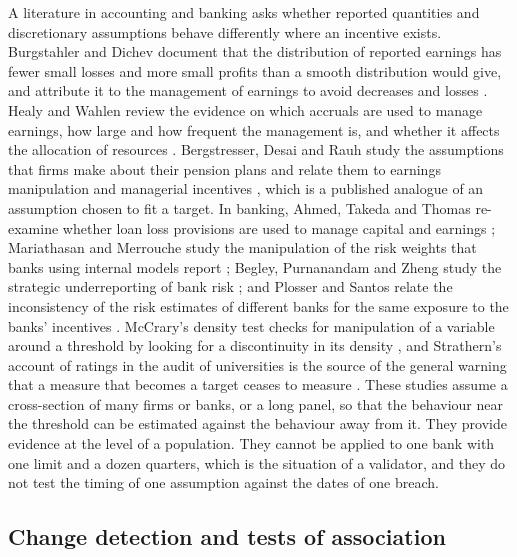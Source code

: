 A literature in accounting and banking asks whether reported quantities and discretionary assumptions behave differently where an incentive exists. Burgstahler and Dichev document that the distribution of reported earnings has fewer small losses and more small profits than a smooth distribution would give, and attribute it to the management of earnings to avoid decreases and losses \citep{burgstahler1997}. Healy and Wahlen review the evidence on which accruals are used to manage earnings, how large and how frequent the management is, and whether it affects the allocation of resources \citep{healy1999}. Bergstresser, Desai and Rauh study the assumptions that firms make about their pension plans and relate them to earnings manipulation and managerial incentives \citep{bergstresser2006}, which is a published analogue of an assumption chosen to fit a target. In banking, Ahmed, Takeda and Thomas re-examine whether loan loss provisions are used to manage capital and earnings \citep{ahmed1999}; Mariathasan and Merrouche study the manipulation of the risk weights that banks using internal models report \citep{mariathasan2014}; Begley, Purnanandam and Zheng study the strategic underreporting of bank risk \citep{begley2017}; and Plosser and Santos relate the inconsistency of the risk estimates of different banks for the same exposure to the banks' incentives \citep{plosser2018}. McCrary's density test checks for manipulation of a variable around a threshold by looking for a discontinuity in its density \citep{mccrary2008}, and Strathern's account of ratings in the audit of universities is the source of the general warning that a measure that becomes a target ceases to measure \citep{strathern1997}. These studies assume a cross-section of many firms or banks, or a long panel, so that the behaviour near the threshold can be estimated against the behaviour away from it. They provide evidence at the level of a population. They cannot be applied to one bank with one limit and a dozen quarters, which is the situation of a validator, and they do not test the timing of one assumption against the dates of one breach.

\subsection{Change detection and tests of association}
\label{sec:rw-statistics}


